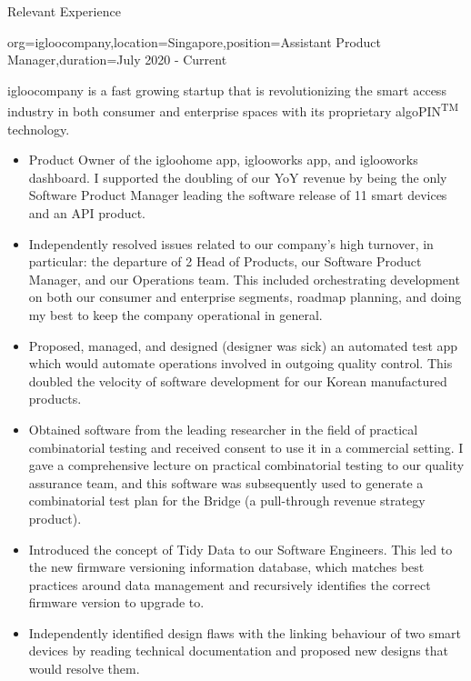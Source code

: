\documentclass{resume}
\begin{document}
\makeheader

\begin{ResumeSection}{Relevant Experience}
    \begin{ResumeSubsection}{org=igloocompany,location={Singapore},position={Assistant Product Manager},duration=July 2020 - Current}
    
    igloocompany is a fast growing startup that is revolutionizing the smart access industry in both consumer and enterprise spaces with its proprietary algoPIN\textsuperscript{TM} technology.
    \vspace{0.2cm}
        \begin{itemize}
        \setlength\itemsep{0.05cm}
            \item Product Owner of the igloohome app, iglooworks app, and iglooworks dashboard. I supported the doubling of our YoY revenue by being the only Software Product Manager leading the software release of 11 smart devices and an API product.
            \item Independently resolved issues related to our company's high turnover, in particular: the departure of 2 Head of Products, our Software Product Manager, and our Operations team. This included orchestrating development on both our consumer and enterprise segments, roadmap planning, and doing my best to keep the company operational in general.
            \item Proposed, managed, and designed (designer was sick) an automated test app which would automate operations involved in outgoing quality control. This doubled the velocity of software development for our Korean manufactured products.
            \item Obtained software from the leading researcher in the field of practical combinatorial testing and received consent to use it in a commercial setting. I gave a comprehensive lecture on practical combinatorial testing to our quality assurance team, and this software was subsequently used to generate a combinatorial test plan for the Bridge (a pull-through revenue strategy product).
            \item Introduced the concept of Tidy Data to our Software Engineers. This led to the new firmware versioning information database, which matches best practices around data management and recursively identifies the correct firmware version to upgrade to.
            \item Independently identified design flaws with the linking behaviour of two smart devices by reading technical documentation and proposed new designs that would resolve them.

\end{itemize}
\end{ResumeSubsection}
\end{ResumeSection}
\end{document}
